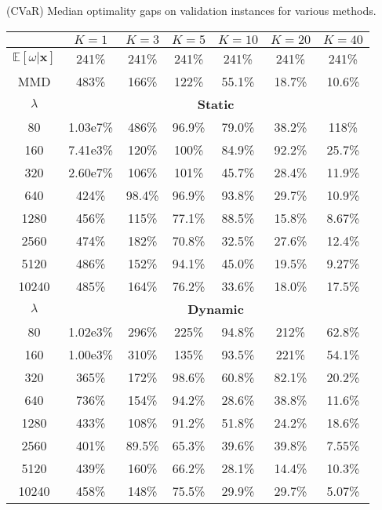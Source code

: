 \begin{table}[h]
    \centering 
        \TABLE
        {(CVaR) Median optimality gaps on validation instances for various methods. \label{tab:cvar_gaps}}
        {
        \begin{tabular}{ccccccc}
        \toprule
         & $K=1$ & $K=3$ & $K=5$ & $K=10$ & $K=20$ & $K=40$ \\
        \midrule
        $\mathbb{E}[\omega | \mathbf{x}]$ & 241\%      & 241\%      & 241\%      & 241\%      & 241\%      & 241\%      \\
        MMD & 483\%      & 166\%      & 122\%      & 55.1\%     & 18.7\%     & 10.6\%     \\
        \midrule
        \multicolumn{1}{c}{$\lambda$} & \multicolumn{6}{c}{\textbf{Static}} \\
        \midrule
        80    & 1.03e7\%   & 486\%      & 96.9\%     & 79.0\%     & 38.2\%     & 118\%      \\
        160   & 7.41e3\%   & 120\%      & 100\%      & 84.9\%     & 92.2\%     & 25.7\%     \\
        320   & 2.60e7\%   & 106\%      & 101\%      & 45.7\%     & 28.4\%     & 11.9\%     \\
        640   & 424\%      & 98.4\%     & 96.9\%     & 93.8\%     & 29.7\%     & 10.9\%     \\
        1280  & 456\%      & 115\%      & 77.1\%     & 88.5\%     & 15.8\%     & 8.67\%     \\
        2560  & 474\%      & 182\%      & 70.8\%     & 32.5\%     & 27.6\%     & 12.4\%     \\
        5120  & 486\%      & 152\%      & 94.1\%     & 45.0\%     & 19.5\%     & 9.27\%     \\
        10240 & 485\%      & 164\%      & 76.2\%     & 33.6\%     & 18.0\%     & 17.5\%     \\
        \midrule
        \multicolumn{1}{c}{$\lambda$} & \multicolumn{6}{c}{\textbf{Dynamic}} \\
        \midrule
        80    & 1.02e3\%   & 296\%      & 225\%      & 94.8\%     & 212\%      & 62.8\%     \\
        160   & 1.00e3\%   & 310\%      & 135\%      & 93.5\%     & 221\%      & 54.1\%     \\
        320   & 365\%      & 172\%      & 98.6\%     & 60.8\%     & 82.1\%     & 20.2\%     \\
        640   & 736\%      & 154\%      & 94.2\%     & 28.6\%     & 38.8\%     & 11.6\%     \\
        1280  & 433\%      & 108\%      & 91.2\%     & 51.8\%     & 24.2\%     & 18.6\%     \\
        2560  & 401\%      & 89.5\%     & 65.3\%     & 39.6\%     & 39.8\%     & 7.55\%     \\
        5120  & 439\%      & 160\%      & 66.2\%     & 28.1\%     & 14.4\%     & 10.3\%     \\
        10240 & 458\%      & 148\%      & 75.5\%     & 29.9\%     & 29.7\%     & 5.07\%     \\
        \bottomrule
        \end{tabular}}{}
    \end{table}
